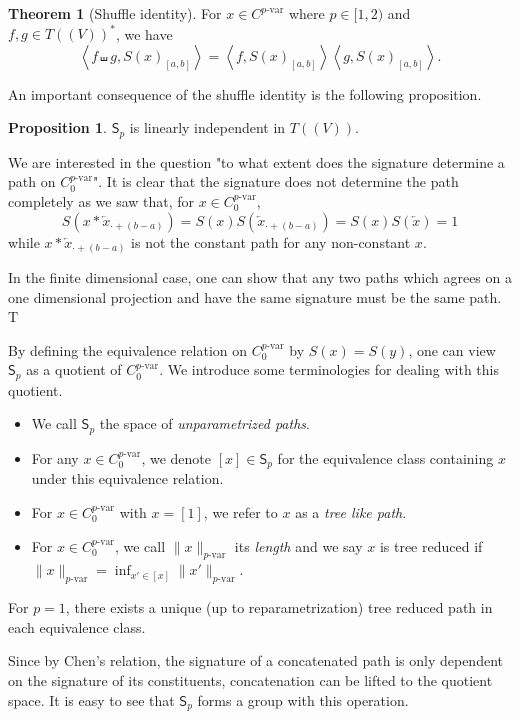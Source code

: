 \documentclass[]{article}
\theoremstyle{definition}
\newtheorem{theorem}{Theorem}
\theoremstyle{definition}
\newtheorem{proposition}{Proposition}[section]
\def\<{\left\langle}
\def\>{\right\rangle}
\newcommand{\pvar}{{p\text{-var}}}
\begin{document}
\begin{theorem}[Shuffle identity]
  For \(x \in C^\pvar\) where \(p \in [1, 2)\) and \(f, g \in T((V))^*\), we have 
  \[\<f \shuffle g, S(x)_{[a, b]}\> = \<f, S(x)_{[a, b]}\>\<g, S(x)_{[a, b]}\>.\]
\end{theorem}

An important consequence of the shuffle identity is the following proposition.
\begin{proposition}
  \(\mathsf{S}_p\) is linearly independent in \(T((V))\).
\end{proposition}

We are interested in the question "to what extent does the signature determine a path on \(C^\pvar_0\)". It is clear 
that the signature does not determine the path completely as we saw that, for \(x \in C^\pvar_0\), 
\[S(x * \overleftarrow{x}_{\cdot + (b - a)}) = S(x) S(\overleftarrow{x}_{\cdot + (b - a)}) = S(x)S(\overleftarrow{x}) = 1\] 
while \(x * \overleftarrow{x}_{\cdot + (b - a)}\) is not the constant path for any non-constant \(x\).

In the finite dimensional case, one can show that any two paths which agrees on a one dimensional 
projection and have the same signature must be the same path. T

By defining the equivalence relation on \(C^\pvar_0\) by \(S(x) = S(y)\), one can view \(\mathsf{S}_p\) 
as a quotient of \(C^\pvar_0\). We introduce some terminologies for dealing with this quotient.
\begin{itemize}
  \item We call \(\mathsf{S}_p\) the space of \textit{unparametrized paths}.
  \item For any \(x \in C^\pvar_0\), we denote \([x] \in \mathsf{S}_p\) for the 
    equivalence class containing \(x\) under this equivalence relation. 
  \item For \(x \in C^\pvar_0\) with \(x = [1]\), we refer to \(x\) as a \textit{tree like path}.
  \item For \(x \in C^\pvar_0\), we call \(\|x\|_{\pvar}\) its \textit{length} and we say \(x\) 
    is tree reduced if \(\|x\|_{\pvar} = \inf_{x' \in [x]} \|x'\|_{\pvar}\).
\end{itemize}

For \(p = 1\), there exists a unique (up to reparametrization) tree reduced path in each equivalence class.

Since by Chen's relation, the signature of a concatenated path is only dependent on the signature of 
its constituents, concatenation can be lifted to the quotient space. It is easy to see that 
\(\mathsf{S}_p\) forms a group with this operation.
\end{document}

